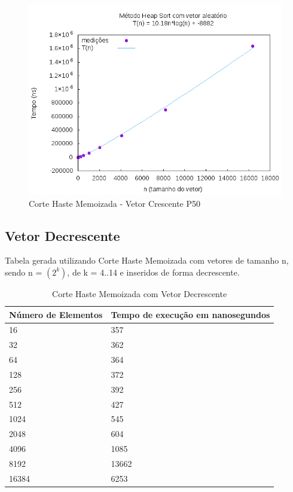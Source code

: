 \documentclass[12pt,a4paper,twoside]{report}
\begin{document}
\begin{figure}[H]
    \centering
    \includegraphics[width=0.7\linewidth]{graficos/HeapSort/vIntAleatorio/vIntAleatorio.png}
  \caption{Corte Haste Memoizada - Vetor Crescente P50}
\end{figure}


\subsection{Vetor Decrescente}
Tabela gerada utilizando Corte Haste Memoizada com vetores de tamanho n, sendo n = $(2^k)$, de k = 4..14 e inseridos de forma decrescente.
\begin{table}[H]
\centering
\caption{Corte Haste Memoizada com Vetor Decrescente}
\label{my-label}
\begin{tabular}{|l|l|}
\hline
\multicolumn{1}{|c|}{\textbf{Número de Elementos}} & \multicolumn{1}{c|}{\textbf{Tempo de execução em nanosegundos}} \\ \hline
16 & 357 \\ \hline
32 & 362 \\ \hline
64 & 364 \\ \hline
128 & 372 \\ \hline
256 & 392 \\ \hline
512 & 427 \\ \hline
1024 & 545 \\ \hline
2048 & 604 \\ \hline
4096 & 1085 \\ \hline
8192 & 13662 \\ \hline
16384 & 6253 \\ \hline
\end{tabular}
\end{table}
\end{document}
